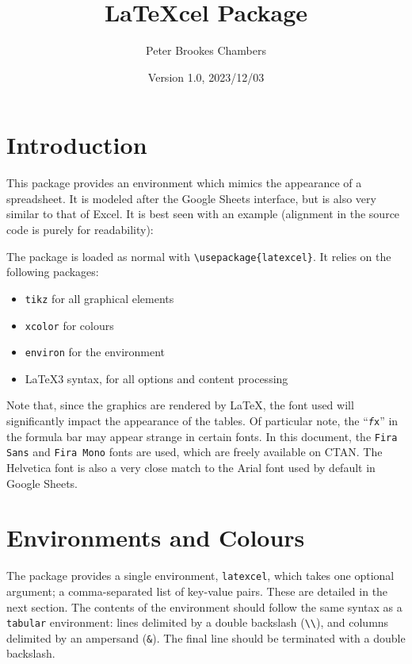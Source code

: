 \documentclass[table]{article}
\title{LaTeXcel Package}
\author{Peter Brookes Chambers}
\date{Version 1.0, 2023/12/03}
\newcommand{\loadexample}[1]{
    \qoinputlisting[mdframed options = {nobreak=true}]{examples/#1.tex}
    \begin{centeredbox}
        
    \end{centeredbox}
}
\newcommand{\semibold}[1]{{\firabook #1}}
\newcommand{\emphasis}[1]{{\color{Red}\semibold{#1}}}
\begin{document}
\maketitle

\tableofcontents

\clearpage

\section{Introduction}

This package provides an environment which mimics the appearance of a spreadsheet. It is modeled after the Google Sheets interface, but is also very similar to that of Excel. It is best seen with an example (alignment in the source code is purely for readability):

\loadexample{full_example}

The package is loaded as normal with \verb|\usepackage{latexcel}|. It relies on the following packages:
\begin{itemize}
    \item \texttt{tikz} for all graphical elements
    \item \texttt{xcolor} for colours
    \item \texttt{environ} for the environment
    \item \LaTeX3 syntax, for all options and content processing
\end{itemize}

Note that, since the graphics are rendered by \LaTeX, the font used will significantly impact the appearance of the tables. Of particular note, the ``{\texttt{\textit{\selectfont f}}\hspace{-0.5ex}\texttt{\selectfont x}}'' in the formula bar may appear strange in certain fonts. In this document, the \texttt{Fira Sans} and \texttt{Fira Mono} fonts are used, which are freely available on CTAN. The Helvetica font is also a very close match to the Arial font used by default in Google Sheets.

\section{Environments and Colours}

The package provides a single environment, \verb|latexcel|, which takes one optional argument; a comma-separated list of key-value pairs. These are detailed in the next section. The contents of the environment should follow the same syntax as a \texttt{tabular} environment: lines delimited by a double backslash (\verb|\\|), and columns delimited by an ampersand (\verb|&|). The final line should \emphasis{not} be terminated with a double backslash.
\end{document}
